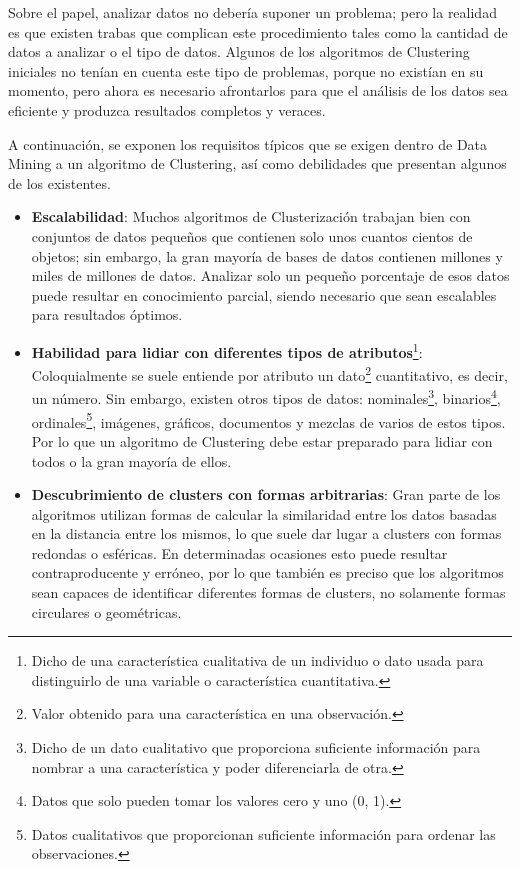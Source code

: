 \documentclass[3p,twocolumn]{elsarticle}
\begin{document}
\cite{16} Sobre el papel, analizar datos no debería suponer un problema; pero la realidad es que existen trabas que complican este procedimiento tales como la cantidad de datos a analizar o el tipo de datos. Algunos de los algoritmos de Clustering iniciales no tenían en cuenta este tipo de problemas, porque no existían en su momento, pero ahora es necesario afrontarlos para que el análisis de los datos sea eficiente y produzca resultados completos y veraces.

A continuación, se exponen los requisitos típicos que se exigen dentro de Data Mining a un algoritmo de Clustering, así como debilidades que presentan algunos de los existentes.

\begin{itemize}
  \item \textbf{Escalabilidad}: Muchos algoritmos de Clusterización trabajan bien con conjuntos de datos pequeños que contienen solo unos cuantos cientos de objetos; sin embargo, la gran mayoría de bases de datos contienen millones y miles de millones de datos. Analizar solo un pequeño porcentaje de esos datos puede resultar en conocimiento parcial, siendo necesario que sean escalables para resultados óptimos.
  
  \item \textbf{Habilidad para lidiar con diferentes tipos de atributos}\footnote{Dicho de una característica cualitativa de un individuo o dato usada para distinguirlo de una variable o característica cuantitativa.}: Coloquialmente se suele entiende por atributo un dato\footnote{Valor obtenido para una característica en una observación.} cuantitativo, es decir, un número. Sin embargo, existen otros tipos de datos: nominales\footnote{Dicho de un dato cualitativo que proporciona suficiente información para nombrar a una característica y poder diferenciarla de otra.}, binarios\footnote{Datos que solo pueden tomar los valores cero y uno (0, 1).}, ordinales\footnote{Datos cualitativos que proporcionan suficiente información para ordenar las observaciones.}, imágenes, gráficos, documentos y mezclas de varios de estos tipos. Por lo que un algoritmo de Clustering debe estar preparado para lidiar con todos o la gran mayoría de ellos.
  
  \item \textbf{Descubrimiento de clusters con formas arbitrarias}: Gran parte de los algoritmos utilizan formas de calcular la similaridad entre los datos basadas en la distancia entre los mismos, lo que suele dar lugar a clusters con formas redondas o esféricas. En determinadas ocasiones esto puede resultar contraproducente y erróneo, por lo que también es preciso que los algoritmos sean capaces de identificar diferentes formas de clusters, no solamente formas circulares o geométricas.
  

\end{itemize}
\end{document}
